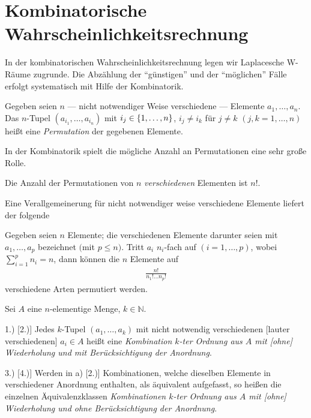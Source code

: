 \chapter{Kombinatorische Wahrscheinlichkeitsrechnung}

In der kombinatorischen Wahrscheinlichkeitsrechnung legen wir Laplacesche
W-Räume zugrunde. Die Abzählung der ``günstigen'' und der ``möglichen'' Fälle
erfolgt systematisch mit Hilfe der Kombinatorik.

\begin{defn}
\label{defn:2.1} Gegeben seien $n$ --- nicht notwendiger Weise verschiedene ---
Elemente $a_{1}, \ldots, a_{n}$. Das $n$-Tupel $({\displaystyle a_{i_{1}},
\ldots , a_{i_{n}}})$ mit $i_{j} \in \left\{ 1, \ldots, n \right\}$, $i_{j} \neq i_{k}$ für
$j \neq k$ $(j,k=1, \ldots , n)$ heißt eine \emph{Permutation} der gegebenen
Elemente.\fishhere
\end{defn}

In der Kombinatorik spielt die mögliche Anzahl an Permutationen eine sehr große
Rolle.

\begin{prop}
\label{prop:2.1}
Die Anzahl der Permutationen von $n$ \textit{verschiedenen} Elementen
ist $n!$.
\end{prop}

Eine Verallgemeinerung für nicht notwendiger weise verschiedene Elemente
liefert der folgende
\begin{prop}
\label{prop:2.2}
Gegeben seien $n$ Elemente; die verschiedenen Elemente darunter
seien mit $a_{1}, \ldots, a_{p}$ bezeichnet $($mit $p \leq n)$. Tritt $a_{i}$
$n_{i}$-fach auf $(i=1, \ldots, p)$, wobei $\sum^{p}_{i=1} n_{i}=n$,
dann können die $n$ Elemente auf
\begin{align*}
\frac{n!}{n_{1}! \ldots n_{p}!}
\end{align*}
verschiedene Arten permutiert werden.\fishhere
\end{prop}

\begin{defn}
\label{defn:2.2}
Sei $A$ eine $n$-elementige Menge, $k \in \mathbb{N}$.
\begin{defnenum}
\item[1.)]
[2.)] Jedes $k$-Tupel $(a_{1}, \ldots, a_{k})$ mit nicht notwendig verschiedenen
[lauter verschiedenen] $a_{i} \in A$ heißt eine \emph{Kombination
$k$-ter Ordnung aus $A$ mit [ohne] Wiederholung und mit
Berücksichtigung der Anordnung}.
\item[3.)]
[4.)] Werden in a) [2.)] Kombinationen, welche dieselben Elemente in
verschiedener
Anordnung enthalten, als äquivalent aufgefasst, so heißen die einzelnen
Äquivalenz\-klassen \emph{Kombinationen $k$-ter Ordnung aus $A$ mit [ohne]
Wiederholung und ohne Berück\-sichtigung der Anordnung}.\fishhere
\end{defnenum}
\end{defn}

